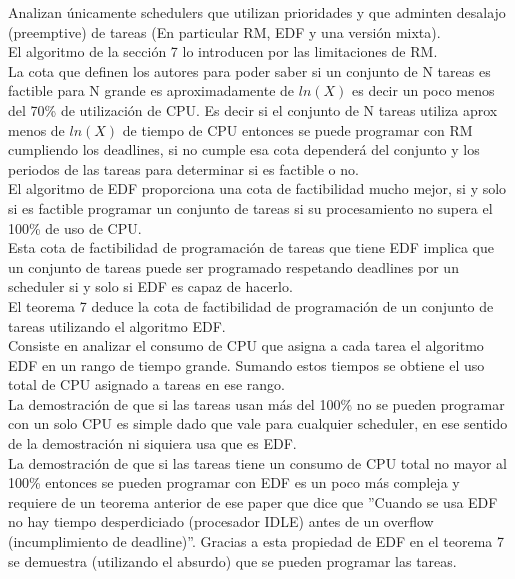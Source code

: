 Analizan únicamente schedulers que utilizan prioridades y que adminten desalajo (preemptive) de tareas (En particular RM, EDF y una versión mixta).\\


El algoritmo de la sección 7 lo introducen por las limitaciones de RM.\\


La cota que definen los autores para poder saber si un conjunto de N tareas es factible para N grande es aproximadamente de $ln(X)$ es decir un poco menos del 70\% de utilización de CPU.
Es decir si el conjunto de N tareas utiliza aprox menos de $ln(X)$ de tiempo de CPU entonces se puede programar con RM cumpliendo los deadlines, si no cumple esa cota dependerá del conjunto y los periodos de las tareas para determinar si es factible o no. \\


El algoritmo de EDF proporciona una cota de factibilidad mucho mejor, si y solo si es factible programar un conjunto de tareas si su procesamiento no supera el 100\% de uso de CPU.\\


Esta cota de factibilidad de programación de tareas que tiene EDF implica que un conjunto de tareas puede ser programado respetando deadlines por un scheduler si y solo si EDF es capaz de hacerlo.\\


El teorema 7 deduce la cota de factibilidad de programación de un conjunto de tareas utilizando el algoritmo EDF.\\

Consiste en analizar el consumo de CPU que asigna a cada tarea el algoritmo EDF en un rango de tiempo grande. Sumando estos tiempos se obtiene el uso total de CPU asignado a tareas en ese rango. \\

La demostración de que si las tareas usan más del 100\% no se pueden programar con un solo CPU es simple dado que vale para cualquier scheduler, en ese sentido de la demostración ni siquiera usa que es EDF. \\

La demostración de que si las tareas tiene un consumo de CPU total no mayor al 100\% entonces se pueden programar con EDF es un poco más compleja y requiere de un teorema anterior de ese paper que dice que ''Cuando se usa EDF no hay tiempo desperdiciado (procesador IDLE) antes de un overflow (incumplimiento de deadline)''. Gracias a esta propiedad de EDF en el teorema 7 se demuestra (utilizando el absurdo) que se pueden programar las tareas.\\



